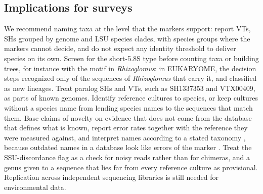 \documentclass[11pt]{article}
\newcommand{\spn}[1]{\emph{#1}}   %
\begin{document}
\subsection{Implications for surveys}
We recommend naming taxa at the level that the markers support: report VTs, SHs grouped by genome and LSU species
clades, with species groups where the markers cannot decide, and do not expect any identity threshold to deliver
species on its own. Screen for the short-5.8S type before counting taxa or building trees, for instance with the motif in
\spn{Rhizoglomus}: in EUKARYOME, the decision steps recognized only \EkFxMotifRhizDiv{} of the \EkFxMotifRhiz{}
sequences of \spn{Rhizoglomus} that carry it, and classified \EkFxMotifRhizLineage{} as new lineages. Treat
paralog SHs and VTs, such as SH1337353 and VTX00409, as parts of known genomes. Identify reference cultures to
species, or keep cultures without a species name from lending species names to the sequences that match them. Base
claims of novelty on evidence that does not come
from the database that defines what is known, report error rates together with the reference they were measured
against, and interpret names according to a stated taxonomy \cite{tedersoo2024amf}, because outdated names in a database look like errors of
the marker \cite{dasilva2024families}. Treat the SSU-discordance flag as a check for noisy reads rather than for
chimeras, and a genus given to a sequence that lies far from every reference culture as provisional. Replication
across independent sequencing libraries is still needed for environmental data.
\end{document}
